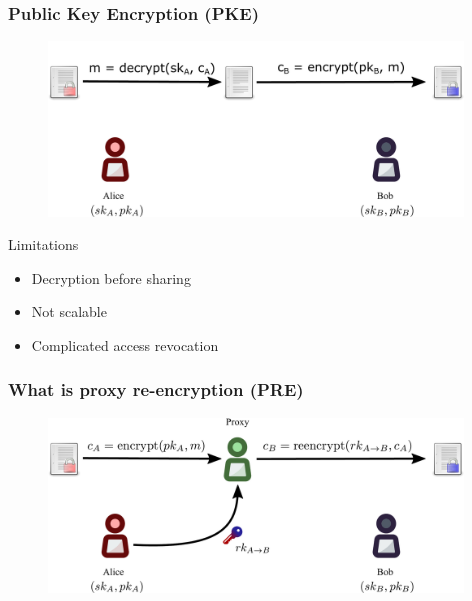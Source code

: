 \documentclass[xetex,mathsans,sans]{beamer}
\begin{document}
    \begin{frame}
        \frametitle{Public Key Encryption (PKE)}
        \begin{figure}
            \centering
            \includegraphics[width=11cm]{pdf/pke.pdf}
        \end{figure}

        Limitations
        \begin{itemize}
            \item Decryption before sharing
            \item Not scalable
            \item Complicated access revocation
        \end{itemize}
    \end{frame}

    \begin{frame}
        \frametitle{What is proxy re-encryption (PRE)}
        \begin{figure}
            \centering
            \includegraphics[width=11cm]{pdf/pre.pdf}
        \end{figure}
    \end{frame}
\end{document}
